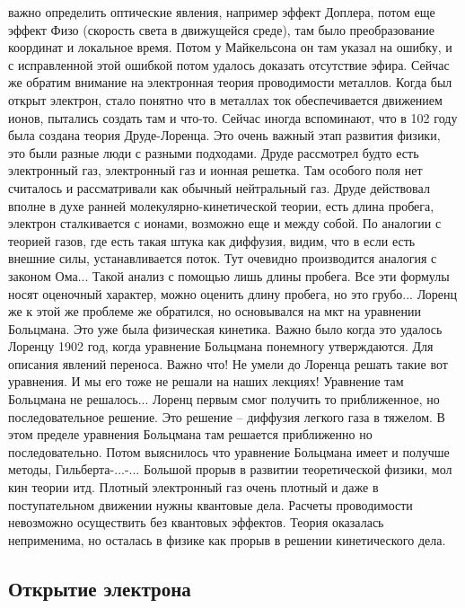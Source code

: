 \documentclass[a4paper, 12pt]{article}
\begin{document}
важно определить оптические явления, например эффект Доплера, потом еще 
эффект Физо (скорость света в движущейся среде), там было преобразование 
координат и локальное время. Потом у Майкельсона он там указал на 
ошибку, и с исправленной этой ошибкой потом удалось доказать отсутствие 
эфира. Сейчас же обратим внимание на электронная теория проводимости 
металлов. Когда был открыт электрон, стало понятно что в металлах ток 
обеспечивается движением ионов, пытались создать там и что-то. Сейчас 
иногда вспоминают, что в 102 году была создана теория Друде-Лоренца. Это 
очень важный этап развития физики, это были разные люди с разными 
подходами. Друде рассмотрел будто есть электронный газ, электронный газ 
и ионная решетка. Там особого поля нет считалось и рассматривали как 
обычный нейтральный газ. Друде действовал вполне в духе ранней 
молекулярно-кинетической теории, есть длина пробега, электрон 
сталкивается с ионами, возможно еще и между собой. По аналогии с теорией 
газов, где есть такая штука как диффузия, видим, что в если есть внешние 
силы, устанавливается поток. Тут очевидно производится аналогия 
с законом Ома... Такой анализ с помощью лишь длины пробега. Все эти 
формулы носят оценочный характер, можно оценить длину пробега, но это 
грубо... Лоренц же к этой же проблеме же обратился, но основывался на 
мкт на уравнении Больцмана. Это уже была физическая кинетика. Важно было 
когда это удалось Лоренцу 1902 год, когда уравнение Больцмана понемногу 
утверждаются. Для описания явлений переноса. Важно что! Не умели до 
Лоренца решать такие вот уравнения. И мы его тоже не решали на наших 
лекциях! Уравнение там Больцмана не решалось... Лоренц первым смог 
получить то приближенное, но последовательное решение. Это решение -- 
диффузия легкого газа в тяжелом. В этом пределе уравнения Больцмана там 
решается приближенно но последовательно. Потом выяснилось что уравнение 
Больцмана имеет и получше методы, Гильберта-...-... Большой прорыв 
в развитии теоретической физики, мол кин теории итд. Плотный электронный 
газ очень плотный и даже в поступательном движении нужны квантовые дела. 
Расчеты проводимости невозможно осуществить без квантовых эффектов. 
Теория оказалась неприменима, но осталась в физике как прорыв в решении 
кинетического дела.

\subsection{Открытие электрона}
\end{document}

